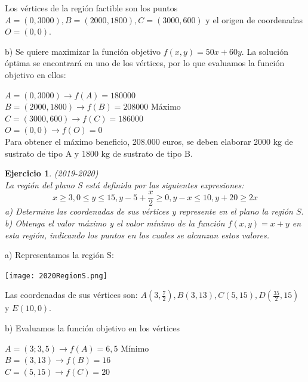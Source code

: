 \documentclass[12pt, a4paper]{amsart}
\newtheorem{ejer}{Ejercicio}
\newcommand{\s}{\color[rgb]{0,0,0.5}}
\newcommand{\n}{\color[rgb]{0,0,0}}
\begin{document}
Los vértices de la región factible son los puntos $A=(0,3000), B=(2000,1800), C=(3000,600)$ y el origen de coordenadas $O=(0,0).$


b) Se quiere maximizar la función objetivo $f(x,y)=50x+60y.$ La solución óptima se encontrará en uno de los vértices, por lo que evaluamos la función objetivo en ellos:

$A=(0,3000) \rightarrow f(A)=180000$\\

$B=(2000, 1800) \rightarrow f(B)=208000$ Máximo\\

$C=(3000, 600) \rightarrow f(C)=186000$\\

$O=(0,0) \rightarrow f(O)=0$\\

Para obtener el máximo beneficio, 208.000 euros, se deben elaborar 2000 kg de sustrato de tipo A y 1800 kg de sustrato de tipo B.

\n

\begin{ejer}\em (2019-2020)\\
La región del plano S está definida por las siguientes expresiones:
\[
x\geq 3, 0\leq y\leq 15, y-5+\frac{x}{2}\geq 0, y-x\leq 10, y+20\geq 2x
\]
a) Determine las coordenadas de sus vértices y represente en el plano la región $S.$\\
b) Obtenga el valor máximo y el valor mínimo de la función $f (x, y) = x + y$ en esta región, indicando los puntos en los cuales se alcanzan estos valores.
\end{ejer}
\s

a) Representamos la región S:

\begin{center}
\texttt{[image: 2020RegionS.png]}
\end{center}



Las coordenadas de sus vértices son: $A(3,\frac{7}{2}), B(3,13), C(5,15), D(\frac{35}{2}, 15)$ y $E(10,0).$

b) Evaluamos la función objetivo en los vértices
 
$A=(3;3,5) \rightarrow f(A)=6,5$ Mínimo\\

$B=(3,13) \rightarrow f(B)=16$\\

$C=(5,15) \rightarrow f(C)=20$\\
\end{document}
